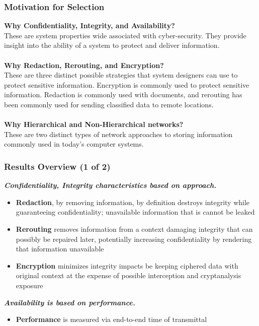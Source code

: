 \documentclass[t,handout]{beamer}
\begin{document}
\begin{frame}
\frametitle{Motivation for Selection}
{\bf Why Confidentiality, Integrity, and Availability?} \\
{\small These are system properties wide associated with cyber-security.  They provide insight into the ability of a system to protect and deliver information.} \\
~\\
{\bf Why Redaction, Rerouting, and Encryption?} \\
{\small These are three distinct possible strategies that system designers can use to protect sensitive information.  Encryption is commonly used to protect sensitive information.  Redaction is commonly used with documents, and rerouting has been commonly used for sending classified data to remote locations.} \\
~\\
{\bf Why Hierarchical and Non-Hierarchical networks?} \\
{\small These are two distinct types of network approaches to storing information commonly used in today's computer systems.}
\end{frame}

\begin{frame}
\frametitle{Results Overview (1 of 2)}
{\bf \textit{Confidentiality, Integrity characteristics based on approach.}} \\
\begin{itemize}
\item {\small {\bf Redaction}, by removing information, by definition destroys integrity while guaranteeing confidentiality; unavailable information that is cannot be leaked}
\item {\small {\bf Rerouting} removes information from a context damaging integrity that can possibly be repaired later, potentially increasing confidentiality by rendering that information unavailable}
\item {\small {\bf Encryption} minimizes integrity impacts be keeping ciphered data with original context at the expense of possible interception and cryptanalysis exposure}
\end{itemize}
{\bf \textit{Availability is based on performance.}} \\
\begin{itemize}
\item {\small {\bf Performance} is measured via end-to-end time of transmittal}
\end{itemize}
\end{frame}
\end{document}

